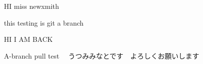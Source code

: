 \documentclass[a4 paper,12pt]{article}
\begin{document}
HI  miss newxmith

this testing is git a branch

HI I AM BACK

A-branch pull test　 うつみみなとです　よろしくお願いします
\end{document}
